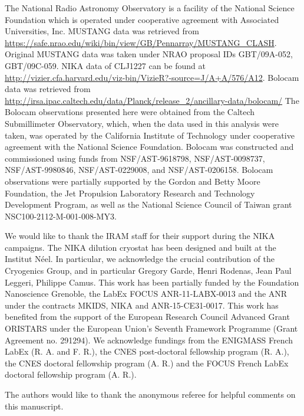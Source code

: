 \documentclass[onecolumn,traditabstract]{aa}
\begin{document}
The National Radio Astronomy Observatory is a facility of the National Science Foundation which is operated
under cooperative agreement with Associated Universities, Inc. MUSTANG data was retrieved from
\url{https://safe.nrao.edu/wiki/bin/view/GB/Pennarray/MUSTANG_CLASH}. Original MUSTANG data was
taken under NRAO proposal IDs GBT/09A-052, GBT/09C-059. NIKA data of CLJ1227 can be found at
\url{http://vizier.cfa.harvard.edu/viz-bin/VizieR?-source=J/A+A/576/A12}. Bolocam data was retrieved from
\url{http://irsa.ipac.caltech.edu/data/Planck/release\_2/ancillary-data/bolocam/}
The Bolocam observations presented here were obtained from the Caltech Submillimeter Observatory, which,
when the data used in this analysis were taken, was operated by the California Institute of Technology under
cooperative agreement with the National Science Foundation. Bolocam was constructed and commissioned using funds
from NSF/AST-9618798, NSF/AST-0098737, NSF/AST-9980846, NSF/AST-0229008, and NSF/AST-0206158. Bolocam observations
were partially supported by the Gordon and Betty Moore Foundation, the Jet Propulsion Laboratory Research and
Technology Development Program, as well as the National Science Council of Taiwan grant NSC100-2112-M-001-008-MY3.

We would like to thank the IRAM staff for their support during the NIKA campaigns. 
The NIKA dilution cryostat has been designed and built at the Institut N\'eel. 
In particular, we acknowledge the crucial contribution of the Cryogenics Group, and 
in particular Gregory Garde, Henri Rodenas, Jean Paul Leggeri, Philippe Camus. 
This work has been partially funded by the Foundation Nanoscience Grenoble, the LabEx FOCUS ANR-11-LABX-0013 and 
the ANR under the contracts MKIDS, NIKA and ANR-15-CE31-0017. 
This work has benefited from the support of the European Research Council Advanced Grant ORISTARS 
under the European Union's Seventh Framework Programme (Grant Agreement no. 291294).
We acknowledge fundings from the ENIGMASS French LabEx (R. A. and F. R.), 
the CNES post-doctoral fellowship program (R. A.), the CNES doctoral fellowship program (A. R.) and 
the FOCUS French LabEx doctoral fellowship program (A. R.).

The authors would like to thank the anonymous referee for helpful comments on this manuscript.

\end{document}
